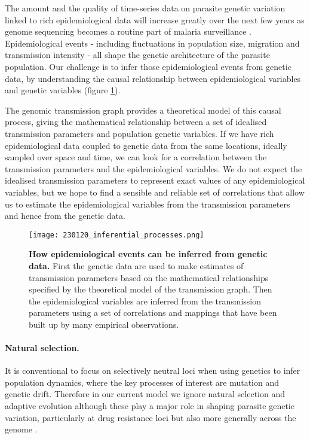 \documentclass[_main.tex]{subfiles}
\begin{document}
The amount and the quality of time-series data on parasite genetic variation linked to rich epidemiological data will increase greatly over the next few years as genome sequencing becomes a routine part of malaria surveillance \cite{Inzaule2021}.  Epidemiological events - including fluctuations in population size, migration and transmission intensity - all shape the genetic architecture of the parasite population.   Our challenge is to infer those epidemiological events from genetic data, by understanding the causal relationship between epidemiological variables and genetic variables (figure \ref{fig:epi_mapping}).

The genomic transmission graph provides a theoretical model of this causal process, giving the mathematical relationship between a set of idealised transmission parameters and population genetic variables.  If we have rich epidemiological data coupled to genetic data from the same locations, ideally sampled over space and time, we can look for a correlation between the transmission parameters and the epidemiological variables.  We do not expect the idealised transmission parameters to represent exact values of any epidemiological variables, but we hope to find a sensible and reliable set of correlations that allow us to estimate the epidemiological variables from the transmission parameters and hence from the genetic data. 

\begin{figure}[h!]
\centering
\texttt{[image: 230120\_inferential\_processes.png]}
\caption{\textbf{How epidemiological events can be inferred from genetic data.}  First the genetic data are used to make estimates of transmission parameters based on the mathematical relationships specified by the theoretical model of the transmission graph.  Then the epidemiological variables are inferred from the transmission parameters using a set of correlations and mappings that have been built up by many empirical observations.}
\label{fig:epi_mapping}
\end{figure}

\paragraph{Natural selection.}  It is conventional to focus on selectively neutral loci when using genetics to infer population dynamics, where the key processes of interest are mutation and genetic drift.   Therefore in our current model we ignore natural selection and adaptive evolution although these play a major role in shaping parasite genetic variation, particularly at drug resistance loci but also more generally across the genome \cite{Anderson2017,Amato2018,Band2022}.   
\end{document}
